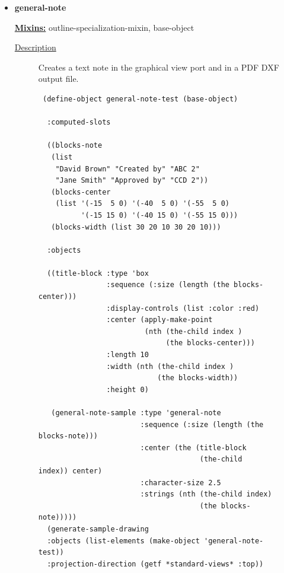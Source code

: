\documentclass [11pt]{book}
\begin{document}
\begin{itemize}
\item {}
\label{prim:general-note}
\textbf{general-note}


\textbf{
\underline{Mixins:}} outline-specialization-mixin, base-object





\begin{description}

\item [
\underline{Description}]


Creates a text note in the graphical view port and in a PDF DXF output file.



\end{description}




\begin{figure}
\begin{lrbox}{\boxedverb}
\begin{minipage}{\linewidth}
{\small

\begin{verbatim} 
 (define-object general-note-test (base-object)
  
  :computed-slots
  
  ((blocks-note 
   (list
    "David Brown" "Created by" "ABC 2"
    "Jane Smith" "Approved by" "CCD 2"))
   (blocks-center 
    (list '(-15  5 0) '(-40  5 0) '(-55  5 0)
          '(-15 15 0) '(-40 15 0) '(-55 15 0)))
   (blocks-width (list 30 20 10 30 20 10)))
  
  :objects 
  
  ((title-block :type 'box
                :sequence (:size (length (the blocks-center)))
                :display-controls (list :color :red)
                :center (apply-make-point 
                         (nth (the-child index ) 
                              (the blocks-center)))
                :length 10
                :width (nth (the-child index ) 
                            (the blocks-width))
                :height 0)

   (general-note-sample :type 'general-note
                        :sequence (:size (length (the blocks-note)))
                        :center (the (title-block 
                                      (the-child index)) center)
                        :character-size 2.5
                        :strings (nth (the-child index) 
                                      (the blocks-note)))))
  (generate-sample-drawing 
  :objects (list-elements (make-object 'general-note-test)) 
  :projection-direction (getf *standard-views* :top))



\end{verbatim}}
\end{minipage}
\end{lrbox}
\end{figure}
\end{itemize}
\end{document}
